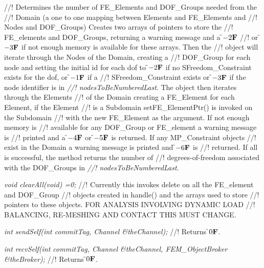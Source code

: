 //! Determines the number of FE\_Elements and DOF\_Groups needed from the
//! Domain (a one to one mapping between Elements and FE\_Elements and
//! Nodes and DOF\_Groups) Creates two arrays of pointers to store the
//! FE\_elements and DOF\_Groups, returning a warning message and a \f$-2{\bf F}$
//! or \f$-3{\bf F}$ if not enough memory is available for these arrays. Then the
//! object will iterate through the Nodes of the Domain, creating a
//! DOF\_Group for each node and setting the initial id for each dof to
\f$-2{\bf F}$ if no SFreedom\_Constraint exists for the dof, or \f$-1{\bf F}$ if a
//! SFreedom\_Constraint exists or \f$-3{\bf F}$ if the node identifier is in {\em
//! nodesToBeNumberedLast}. The object then iterates through the Elements
//! of the Domain creating a FE\_Element for each Element, if the Element
//! is a Subdomain setFE\_ElementPtr() is invoked on the Subdomain
//! with the new FE\_Element as the argument. If not enough memory is
//! available for any DOF\_Group or FE\_element a warning message is
//! printed and a \f$-4{\bf F}$ or \f$-5{\bf F}$ is returned. If any MP\_Constraint objects
//! exist in the Domain a warning message is printed and \f$-6{\bf F}$ is
//! returned. If all is successful, the method returns the number of
//! degrees-of-freedom associated with the DOF\_Groups in {\em
//! nodesToBeNumberedLast}. 

{\em void clearAll(void) =0;}
//! Currently this invokes delete on all the FE\_element and DOF\_Group
//! objects created in handle() and the arrays used to store
//! pointers to these objects. FOR ANALYSIS INVOLVING DYNAMIC LOAD
//! BALANCING, RE-MESHING AND CONTACT THIS MUST CHANGE.

{\em int sendSelf(int commitTag, Channel \&theChannel); }
//! Returns \f$0{\bf F}$.

{\em int recvSelf(int commitTag, Channel \&theChannel, FEM\_ObjectBroker
\&theBroker); }
//! Returns \f$0{\bf F}$. 
